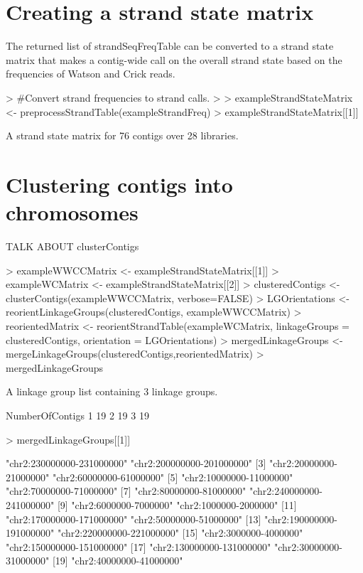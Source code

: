 \documentclass{article}
\begin{document}
\section{Creating a strand state matrix}

The returned list of strandSeqFreqTable can be converted to a strand state matrix that makes a contig-wide call on the overall strand state based on the frequencies of Watson and Crick reads. 

\begin{Schunk}
\begin{Sinput}
> #Convert strand frequencies to strand calls.
> 
> exampleStrandStateMatrix <- preprocessStrandTable(exampleStrandFreq)
> exampleStrandStateMatrix[[1]]
\end{Sinput}
\begin{Soutput}
A strand state matrix for  76  contigs over  28  libraries.
\end{Soutput}
\end{Schunk}


\section{Clustering contigs into chromosomes}

TALK ABOUT clusterContigs

\begin{Schunk}
\begin{Sinput}
> exampleWWCCMatrix <- exampleStrandStateMatrix[[1]]
> exampleWCMatrix <- exampleStrandStateMatrix[[2]]
> clusteredContigs <- clusterContigs(exampleWWCCMatrix, verbose=FALSE)
> LGOrientations <- reorientLinkageGroups(clusteredContigs, exampleWWCCMatrix)
> reorientedMatrix <- reorientStrandTable(exampleWCMatrix, linkageGroups = clusteredContigs, orientation = LGOrientations)
> mergedLinkageGroups <- mergeLinkageGroups(clusteredContigs,reorientedMatrix)
> mergedLinkageGroups
\end{Sinput}
\begin{Soutput}
A linkage group list containing  3  linkage groups.

  NumberOfContigs
1              19
2              19
3              19
\end{Soutput}
\begin{Sinput}
> mergedLinkageGroups[[1]]
\end{Sinput}
\begin{Soutput}
 [1] "chr2:230000000-231000000" "chr2:200000000-201000000"
 [3] "chr2:20000000-21000000"   "chr2:60000000-61000000"  
 [5] "chr2:10000000-11000000"   "chr2:70000000-71000000"  
 [7] "chr2:80000000-81000000"   "chr2:240000000-241000000"
 [9] "chr2:6000000-7000000"     "chr2:1000000-2000000"    
[11] "chr2:170000000-171000000" "chr2:50000000-51000000"  
[13] "chr2:190000000-191000000" "chr2:220000000-221000000"
[15] "chr2:3000000-4000000"     "chr2:150000000-151000000"
[17] "chr2:130000000-131000000" "chr2:30000000-31000000"  
[19] "chr2:40000000-41000000"  
\end{Soutput}
\end{Schunk}
\end{document}
